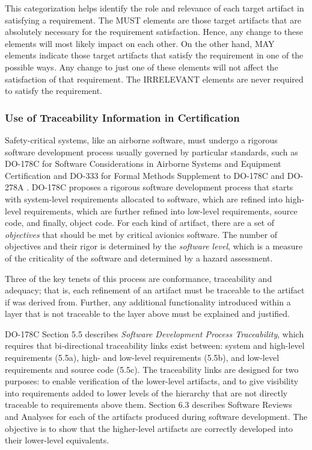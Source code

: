 This categorization helps identify the role and relevance of each target artifact in satisfying a requirement. The MUST elements are those target artifacts that are absolutely necessary for the requirement satisfaction. Hence, any change to these elements will most likely impact on each other. On the other hand, MAY elements indicate those target artifacts that satisfy the requirement in one of the possible ways.  Any change to just one of these elements will not affect the satisfaction of that requirement. The IRRELEVANT elements are never required to satisfy the requirement.

\subsubsection{Use of Traceability Information in Certification}
Safety-critical systems, like an airborne software, must undergo a rigorous software development process usually governed by particular standards, such as DO-178C for Software Considerations in Airborne Systems and Equipment Certification \cite{DO178C} and DO-333 for Formal Methods Supplement to DO-178C and DO-278A \cite{DO333}.
DO-178C proposes a rigorous software development process that starts with system-level requirements allocated to software, which are refined into high-level requirements, which are further refined into low-level requirements, source code, and finally, object code. For each kind of artifact, there are a set of {\em objectives} that should be met by critical avionics software.  The number of objectives and their rigor is determined by the {\em software level}, which is a measure of the criticality of the software and determined by a hazard assessment.

Three of the key tenets of this process are conformance, traceability and adequacy; that is, each refinement of an artifact must be traceable to the artifact if was derived from. Further, any additional functionality introduced within a layer that is not traceable to the layer above must be explained and justified.

DO-178C Section 5.5 describes {\em Software Development Process Traceability}, which requires that bi-directional traceability links exist between: system and high-level requirements (5.5a), high- and low-level requirements (5.5b), and low-level requirements and source code (5.5c).  The traceability links are designed for two purposes: to enable verification of the lower-level artifacts, and to give visibility into requirements added to lower levels of the hierarchy that are not directly traceable to requirements above them.
Section 6.3 describes Software Reviews and Analyses for each of the artifacts produced during software development.   The objective is to show that the higher-level artifacts are correctly developed into their lower-level equivalents.


